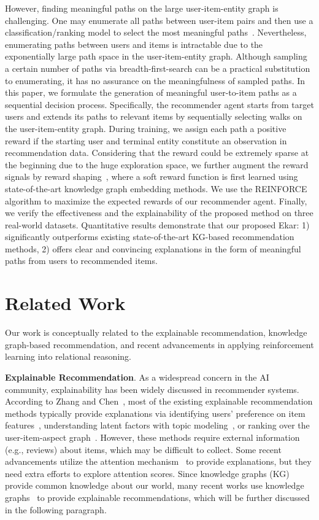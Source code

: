 \documentclass{article}
\newcommand{\name}{Ekar}
\newcommand{\xhdr}[1]{{\noindent\bfseries #1}.}
\begin{document}
However, finding meaningful paths on the large user-item-entity graph is challenging. One may enumerate all paths between user-item pairs and then use a classification/ranking model to select the most meaningful paths~\cite{Wang2018ExplainableRO}. Nevertheless, enumerating paths between users and items is intractable due to the exponentially large path space in the user-item-entity graph. Although sampling a certain number of paths via breadth-first-search can be a practical substitution to enumerating, it has no assurance on the meaningfulness of sampled paths. In this paper, we formulate the generation of meaningful user-to-item paths as a sequential decision process. Specifically, the recommender agent starts from target users and extends its paths to relevant items by sequentially selecting walks on the user-item-entity graph. During training, we assign each path a positive reward if the starting user and terminal entity constitute an observation in recommendation data. Considering that the reward could be extremely sparse at the beginning due to the huge exploration space, we further augment the reward signals by reward shaping~\cite{ng1999policy}, where a soft reward function is first learned using state-of-the-art knowledge graph embedding methods. We use the REINFORCE~\cite{williams1992simple} algorithm to maximize the expected rewards of our recommender agent. Finally, we verify the effectiveness and the explainability of the proposed method on three real-world datasets. Quantitative results demonstrate that our proposed \name: 1) significantly outperforms existing state-of-the-art KG-based recommendation methods, 2) offers clear and convincing explanations in the form of meaningful paths from users to recommended items.


%
 \section{Related Work}
Our work is conceptually related to the explainable recommendation, knowledge graph-based recommendation, and recent advancements in applying reinforcement learning into relational reasoning.

\xhdr{Explainable Recommendation} 
As a widespread concern in the AI community, explainability has been widely discussed in recommender systems.
According to Zhang and Chen~\cite{zhang2018explainable}, most of the existing explainable recommendation methods typically provide explanations via identifying users' preference on item features~\cite{bauman2017aspect,wang2018explainable,zhang2014explicit}, understanding latent factors with topic modeling~\cite{mcauley2013hidden, wu2015flame,zhao2015sar}, or ranking over the user-item-aspect graph~\cite{he2015trirank}. However, these methods require external information (e.g., reviews) about items, which may be difficult to collect. Some recent advancements utilize the
attention mechanism~\cite{li2017neural,song2019session} to provide explanations, but they need extra efforts to explore attention scores.
Since knowledge graphs (KG) provide common knowledge about our world, many recent works use knowledge graphs~\cite{Cao_2019,wang2018ripplenet,wang2018dkn,zhang2016collaborative} to provide explainable recommendations, which will be further discussed in the following paragraph.
\end{document}
